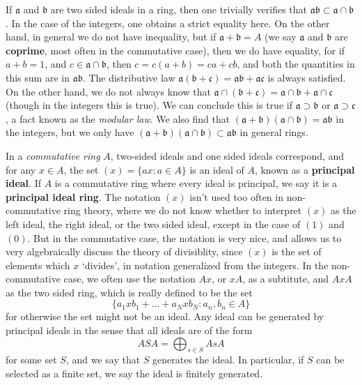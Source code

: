 If $\mathfrak{a}$ and $\mathfrak{b}$ are two sided ideals in a ring, then one trivially verifies that $\mathfrak{a} \mathfrak{b} \subset \mathfrak{a} \cap \mathfrak{b}$. In the case of the integers, one obtains a strict equality here. On the other hand, in general we do not have inequality, but if $\mathfrak{a} + \mathfrak{b} = A$ (we say $\mathfrak{a}$ and $\mathfrak{b}$ are {\bf coprime}, most often in the commutative case), then we do have equality, for if $a + b = 1$, and $c \in \mathfrak{a} \cap \mathfrak{b}$, then $c = c(a + b) = ca + cb$, and both the quantities in this sum are in $\mathfrak{a}\mathfrak{b}$. The distributive law $\mathfrak{a}(\mathfrak{b} + \mathfrak{c}) = \mathfrak{a} \mathfrak{b} + \mathfrak{a} \mathfrak{c}$ is always satisfied. On the other hand, we do not always know that $\mathfrak{a} \cap (\mathfrak{b} + \mathfrak{c}) = \mathfrak{a} \cap \mathfrak{b} + \mathfrak{a} \cap \mathfrak{c}$ (though in the integers this is true). We can conclude this is true if $\mathfrak{a} \supset \mathfrak{b}$ or $\mathfrak{a} \supset \mathfrak{c}$, a fact known as the {\it modular law}. We also find that $(\mathfrak{a} + \mathfrak{b})(\mathfrak{a} \cap \mathfrak{b}) = \mathfrak{a}\mathfrak{b}$ in the integers, but we only have $(\mathfrak{a} + \mathfrak{b})(\mathfrak{a} \cap \mathfrak{b}) \subset \mathfrak{a}\mathfrak{b}$ in general rings.

\begin{example}
    In a {\it commutative ring} $A$, two-sided ideals and one sided ideals correspond, and for any $x \in A$, the set $(x) = \{ ax: a \in A \}$ is an ideal of $A$, known as a {\bf principal ideal}. If $A$ is a commutative ring where every ideal is principal, we say it is a {\bf principal ideal ring}. The notation $(x)$ isn't used too often in non-commutative ring theory, where we do not know whether to interpret $(x)$ as the left ideal, the right ideal, or the two sided ideal, except in the case of $(1)$ and $(0)$. But in the commutative case, the notation is very nice, and allows us to very algebraically discuss the theory of divisiblity, since $(x)$ is the set of elements which $x$ `divides', in notation generalized from the integers. In the non-commutative case, we often use the notation $Ax$, or $xA$, as a subtitute, and $AxA$ as the two sided ring, which is really defined to be the set
    \[ \{ a_1xb_1 + \dots + a_Nxb_N : a_n, b_n \in A \} \]
    for otherwise the set might not be an ideal. Any ideal can be generated by principal ideals in the sense that all ideals are of the form
    \[ ASA = \bigoplus_{s \in S} AsA \]
    for some set $S$, and we say that $S$ generates the ideal. In particular, if $S$ can be selected as a finite set, we say the ideal is finitely generated.
\end{example}

